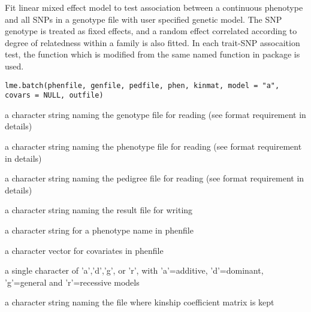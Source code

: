 \begin{Description}\relax
Fit linear mixed effect model to test association between a continuous phenotype 
and all SNPs in a genotype file with user specified genetic model. The SNP genotype is treated
as fixed effects, and a random effect correlated according to degree of relatedness within a 
family is also fitted.
In each trait-SNP assocaition test, the  function which is modified from
the same named function in package  is used.
\end{Description}
\begin{Usage}
\begin{verbatim}
lme.batch(phenfile, genfile, pedfile, phen, kinmat, model = "a", 
covars = NULL, outfile)
\end{verbatim}
\end{Usage}
\begin{Arguments}
\begin{ldescription}
\item[\code{genfile}] a character string naming the genotype file for reading (see format requirement in details) 
\item[\code{phenfile}] a character string naming the phenotype file for reading (see format requirement in details) 
\item[\code{pedfile}] a character string naming the pedigree file for reading (see format requirement in details) 
\item[\code{outfile}] a character string naming the result file for writing 
\item[\code{phen}] a character string for a phenotype name in phenfile 
\item[\code{covars}] a character vector for covariates in phenfile 
\item[\code{model}] a single character of 'a','d','g', or 'r', with 'a'=additive, 'd'=dominant, 'g'=general and 'r'=recessive models 
\item[\code{kinmat}] a character string naming the file where kinship coefficient matrix is kept 
\end{ldescription}
\end{Arguments}
